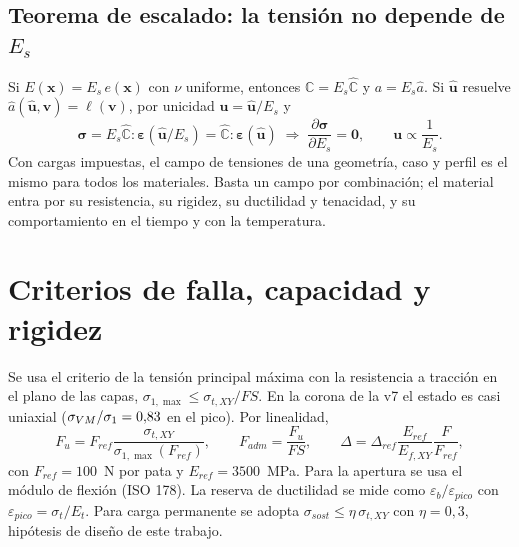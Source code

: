\documentclass[11pt,a4paper]{article}
\newcommand{\sone}{\sigma_1}
\begin{document}
\subsection{Teorema de escalado: la tensión no depende de $E_s$}
Si $E(\mathbf x)=E_s\,e(\mathbf x)$ con $\nu$ uniforme, entonces $\mathbb C=E_s\hat{\mathbb C}$ y $a=E_s\hat a$. Si $\hat{\mathbf u}$ resuelve $\hat a(\hat{\mathbf u},\mathbf v)=\ell(\mathbf v)$, por unicidad $\mathbf u=\hat{\mathbf u}/E_s$ y
\begin{equation}
\bm\sigma=E_s\hat{\mathbb C}:\bm\varepsilon(\hat{\mathbf u}/E_s)=\hat{\mathbb C}:\bm\varepsilon(\hat{\mathbf u})
\;\Longrightarrow\;\frac{\partial\bm\sigma}{\partial E_s}=\mathbf 0,\qquad \mathbf u\propto\frac1{E_s}.
\end{equation}
Con cargas impuestas, el campo de tensiones de una geometría, caso y perfil es el mismo para todos los materiales. Basta un campo por combinación; el material entra por su resistencia, su rigidez, su ductilidad y tenacidad, y su comportamiento en el tiempo y con la temperatura.

\section{Criterios de falla, capacidad y rigidez}
Se usa el criterio de la tensión principal máxima con la resistencia a tracción en el plano de las capas, $\sigma_{1,\max}\le\sigma_{t,XY}/FS$. En la corona de la v7 el estado es casi uniaxial ($\sigma_{VM}/\sone=\VmOverSone$ en el pico). Por linealidad,
\begin{equation}
F_u=F_{ref}\frac{\sigma_{t,XY}}{\sigma_{1,\max}(F_{ref})},\qquad F_{adm}=\frac{F_u}{FS},\qquad
\Delta=\Delta_{ref}\frac{E_{ref}}{E_{f,XY}}\frac{F}{F_{ref}},
\end{equation}
con $F_{ref}=100$~N por pata y $E_{ref}=3500$~MPa. Para la apertura se usa el módulo de flexión (ISO 178). La reserva de ductilidad se mide como $\varepsilon_b/\varepsilon_{pico}$ con $\varepsilon_{pico}=\sigma_t/E_t$. Para carga permanente se adopta $\sigma_{sost}\le\eta\,\sigma_{t,XY}$ con $\eta=0{,}3$, hipótesis de diseño de este trabajo.
\end{document}
